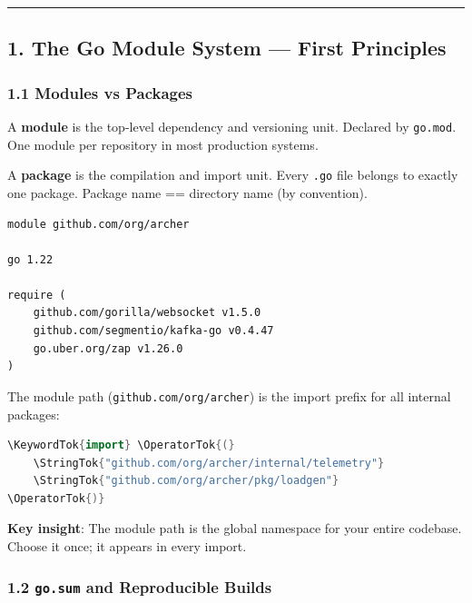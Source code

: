 \documentclass[11pt,openany]{book}
\newcommand{\KeywordTok}[1]{\textcolor[rgb]{0.00,0.44,0.13}{\textbf{#1}}}
\newcommand{\OperatorTok}[1]{\textcolor[rgb]{0.40,0.40,0.40}{#1}}
\newcommand{\StringTok}[1]{\textcolor[rgb]{0.25,0.44,0.63}{#1}}
\begin{document}
\begin{center}\rule{0.5\linewidth}{0.5pt}\end{center}

\hypertarget{the-go-module-system-first-principles}{%
\subsection{1. The Go Module System --- First
Principles}\label{the-go-module-system-first-principles}}

\hypertarget{modules-vs-packages}{%
\subsubsection{1.1 Modules vs Packages}\label{modules-vs-packages}}

A \textbf{module} is the top-level dependency and versioning unit.
Declared by \texttt{go.mod}. One module per repository in most
production systems.

A \textbf{package} is the compilation and import unit. Every
\texttt{.go} file belongs to exactly one package. Package name ==
directory name (by convention).

\begin{verbatim}
module github.com/org/archer

go 1.22

require (
    github.com/gorilla/websocket v1.5.0
    github.com/segmentio/kafka-go v0.4.47
    go.uber.org/zap v1.26.0
)
\end{verbatim}

The module path (\texttt{github.com/org/archer}) is the import prefix
for all internal packages:

\begin{lstlisting}[language=Go]
\KeywordTok{import} \OperatorTok{(}
    \StringTok{"github.com/org/archer/internal/telemetry"}
    \StringTok{"github.com/org/archer/pkg/loadgen"}
\OperatorTok{)}
\end{lstlisting}

\textbf{Key insight}: The module path is the global namespace for your
entire codebase. Choose it once; it appears in every import.

\hypertarget{go.sum-and-reproducible-builds}{%
\subsubsection{\texorpdfstring{1.2 \texttt{go.sum} and Reproducible
Builds}{1.2 go.sum and Reproducible Builds}}\label{go.sum-and-reproducible-builds}}
\end{document}
